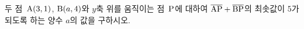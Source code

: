 두 점~$\mathrm{A}(3{,}\mkern3mu\mathopen{}1)$, $\mathrm{B}(a{,}\mkern3mu\mathopen{}4)$와 $y$축 위를 움직이는 점~$\mathrm{P}$에 대하여 $\overline{\mathrm{AP}}+\overline{\mathrm{BP}}$의 최솟값이 $5$가 되도록 하는 양수 $a$의 값을 구하시오.
